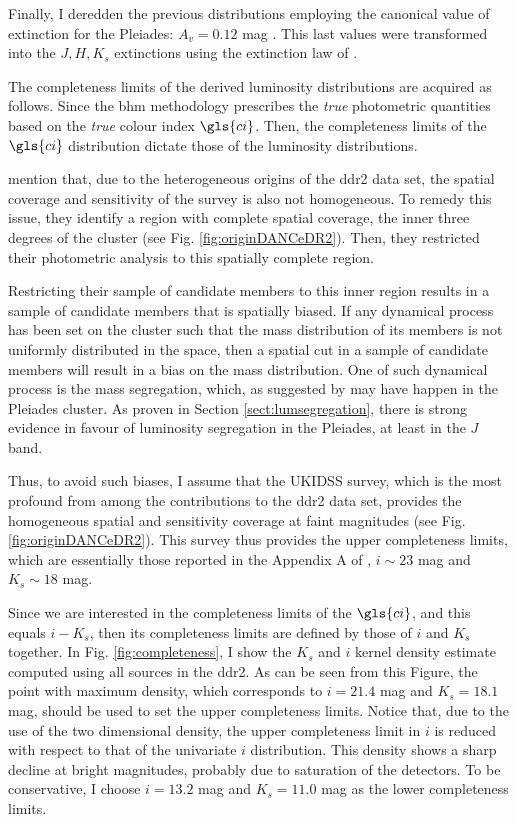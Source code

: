 Finally, I deredden the previous distributions employing the canonical value of extinction for the Pleiades: $A_v=0.12$ mag \citep{Guthrie1987}. This last values were transformed into the $J,H,K_s$ extinctions using the extinction law of \citet{Cardelli1989}.

The completeness limits of the derived luminosity distributions are acquired as follows. Since the \gls{bhm} methodology prescribes the \emph{true} photometric quantities based on the \emph{true} colour index $\gls{ci}$. Then, the completeness limits of the $\gls{ci}$ distribution dictate those of the luminosity distributions. 

\citet{Bouy2015} mention that, due to the heterogeneous origins of the \gls{ddr2} data set, the spatial coverage and sensitivity of the survey is also not homogeneous. To remedy this issue, they identify a region with complete spatial coverage, the inner three degrees of the cluster (see Fig. \ref{fig:originDANCeDR2}). Then, they restricted their photometric analysis to this spatially complete region. 

Restricting their sample of candidate members to this inner region results in a sample of candidate members that is spatially biased. If any dynamical process has been set on the cluster such that the mass distribution of its members is not uniformly distributed in the space, then a spatial cut in a sample of candidate members will result in a bias on the mass distribution. One of such dynamical process is the mass segregation, which, as suggested by \citet{Adams2001} may have happen in the Pleiades cluster. As proven in Section \ref{sect:lumsegregation}, there is strong evidence in favour of luminosity segregation in the Pleiades, at least in the $J$ band.

Thus, to avoid such biases, I assume that the UKIDSS survey, which is the most profound from among the contributions to the \gls{ddr2} data set, provides the homogeneous spatial and sensitivity coverage at faint magnitudes (see Fig. \ref{fig:originDANCeDR2}). This survey thus provides the upper completeness limits, which are essentially those reported in the Appendix A of \citet{Bouy2015}, $i\sim23$ mag and $K_s\sim18$ mag.

Since we are interested in the completeness limits of the $\gls{ci}$, and this equals $i -K_s$, then its completeness limits are defined by those of $i$ and $K_s$ together. In Fig. \ref{fig:completeness}, I show the $K_s$ and $i$ kernel density estimate computed using all sources in the \gls{ddr2}. As can be seen from this Figure, the point with maximum density, which corresponds to $i=21.4$ mag and $K_s=18.1$ mag, should be used to set the upper completeness limits. Notice that, due to the use of the two dimensional density, the upper completeness limit in $i$ is reduced with respect to that of the univariate $i$ distribution. This density shows a sharp decline at bright magnitudes, probably due to saturation of the detectors. To be conservative, I choose $i=13.2$ mag and $K_s=11.0$ mag as the lower completeness limits.

